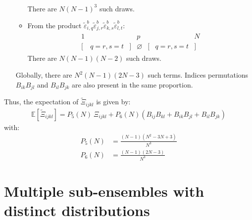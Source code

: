 \documentclass[12pt]{scrartcl}
\begin{document}
\begin{enumerate}
\begin{itemize}
\begin{align}
\begin{array}{ccccccc}
\end{array}
\end{align}
There are $N(N-1)^3$ such draws.
\item From the product $\widetilde{\varepsilon}^b_{i,q} \widetilde{\varepsilon}^b_{j,r} \widetilde{\varepsilon}^b_{k,s} \widetilde{\varepsilon}^b_{l,t}$:
\begin{align}
\begin{array}{ccccccc}
1 & & & p & & & N \\
\big[ & q=r,s=t & \big] & \varnothing & \big[ & q=r,s=t & \big] \nonumber
\end{array}
\end{align}
There are $N(N-1)(N-2)$ such draws.
\end{itemize}
Globally, there are $N^2(N-1)(2N-3)$ such terms. Indices permutations $B_{ik}B_{jl}$ and $B_{il}B_{jk}$ are also present in the same proportion.
\end{enumerate}
$  $\\
Thus, the expectation of $\widetilde{\Xi}_{ijkl}$ is given by:
\begin{align}
\label{eq:exp_mom_4}
\mathbb{E} \left[\widetilde{\Xi}_{ijkl}\right] = P_5(N) \ \Xi_{ijkl} + P_6(N) \left(B_{ij}B_{kl} + B_{ik}B_{jl} + B_{il}B_{jk} \right) 
\end{align}
with:
\begin{subequations}
\begin{align}
P_5(N) & = \frac{(N-1)(N^2-3N+3)}{N^3} \\
P_6(N) & = \frac{(N-1)(2N-3)}{N^3}
\end{align}
\end{subequations}

\clearpage

\section{Multiple sub-ensembles with distinct distributions}
\end{document}
